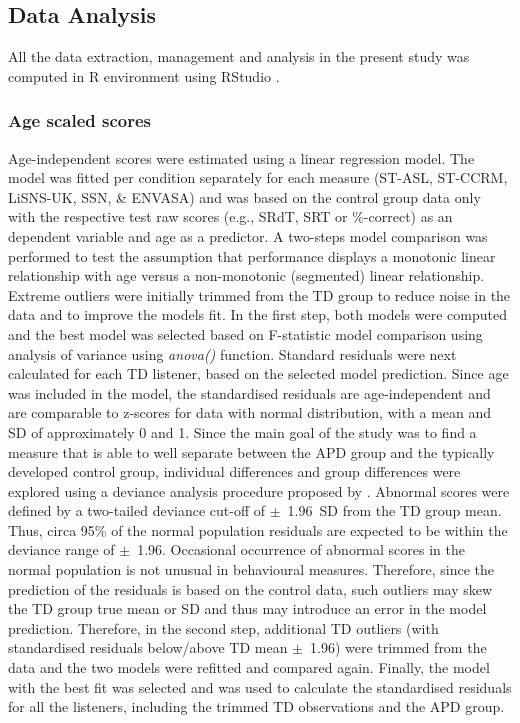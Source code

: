 \documentclass[a4paper, twoside]{templates/ociamthesis}
\begin{document}
\hypertarget{data-analysis}{%
\subsection{Data Analysis}\label{data-analysis}}

All the data extraction, management and analysis in the present study was computed in R environment \autocite[Version 4.0.3;][]{RCore} using RStudio \autocite[Version 1.4.938;][]{RStudio}.\\

\hypertarget{z-scores}{%
\subsubsection{Age scaled scores}\label{z-scores}}

Age-independent scores were estimated using a linear regression model. The model was fitted per condition separately for each measure (ST-ASL, ST-CCRM, LiSNS-UK, SSN, \& ENVASA) and was based on the control group data only with the respective test raw scores (e.g., SRdT, SRT or \%-correct) as an dependent variable and age as a predictor. A two-steps model comparison was performed to test the assumption that performance displays a monotonic linear relationship with age versus a non-monotonic (segmented) linear relationship. Extreme outliers were initially trimmed from the TD group to reduce noise in the data and to improve the models fit. In the first step, both models were computed and the best model was selected based on F-statistic model comparison using analysis of variance using \emph{anova()} function. Standard residuals were next calculated for each TD listener, based on the selected model prediction. Since age was included in the model, the standardised residuals are age-independent and are comparable to z-scores for data with normal distribution, with a mean and SD of approximately 0 and 1. Since the main goal of the study was to find a measure that is able to well separate between the APD group and the typically developed control group, individual differences and group differences were explored using a deviance analysis procedure proposed by \textcite{Ramus2003}. Abnormal scores were defined by a two-tailed deviance cut-off of \(\pm\)~1.96~SD from the TD group mean. Thus, circa 95\% of the normal population residuals are expected to be within the deviance range of \(\pm\)~1.96. Occasional occurrence of abnormal scores in the normal population is not unusual in behavioural measures. Therefore, since the prediction of the residuals is based on the control data, such outliers may skew the TD group true mean or SD and thus may introduce an error in the model prediction. Therefore, in the second step, additional TD outliers (with standardised residuals below/above TD mean \(\pm\)~1.96) were trimmed from the data and the two models were refitted and compared again. Finally, the model with the best fit was selected and was used to calculate the standardised residuals for all the listeners, including the trimmed TD observations and the APD group.
\end{document}
